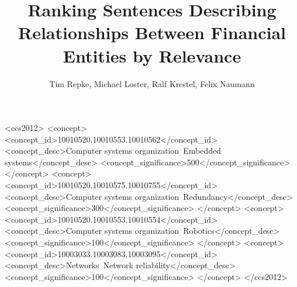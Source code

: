 \documentclass[
	format=sigconf,
	review=false]{acmart}
\title{Ranking Sentences Describing Relationships Between Financial Entities by Relevance}
\author{
	Tim Repke, Michael Loster, Ralf Krestel, Felix Naumann
}
\affiliation{%
	\institution{Hasso-Plattner-Institute}
	\city{Potsdam}
	\country{Germany}
}
\begin{document}

%
%
\begin{CCSXML}
<ccs2012>
 <concept>
  <concept_id>10010520.10010553.10010562</concept_id>
  <concept_desc>Computer systems organization~Embedded systems</concept_desc>
  <concept_significance>500</concept_significance>
 </concept>
 <concept>
  <concept_id>10010520.10010575.10010755</concept_id>
  <concept_desc>Computer systems organization~Redundancy</concept_desc>
  <concept_significance>300</concept_significance>
 </concept>
 <concept>
  <concept_id>10010520.10010553.10010554</concept_id>
  <concept_desc>Computer systems organization~Robotics</concept_desc>
  <concept_significance>100</concept_significance>
 </concept>
 <concept>
  <concept_id>10003033.10003083.10003095</concept_id>
  <concept_desc>Networks~Network reliability</concept_desc>
  <concept_significance>100</concept_significance>
 </concept>
</ccs2012>  
\end{CCSXML}





\maketitle




 
\end{document}
